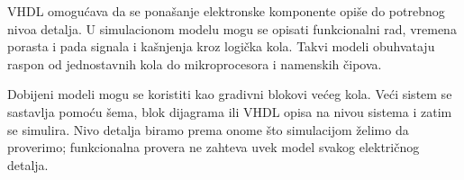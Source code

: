 VHDL omogućava da se ponašanje elektronske komponente opiše do potrebnog nivoa detalja. U simulacionom modelu mogu se opisati funkcionalni rad, vremena porasta i pada signala i kašnjenja kroz logička kola. Takvi modeli obuhvataju raspon od jednostavnih kola do mikroprocesora i namenskih čipova.

Dobijeni modeli mogu se koristiti kao gradivni blokovi većeg kola. Veći sistem se sastavlja pomoću šema, blok dijagrama ili VHDL opisa na nivou sistema i zatim se simulira. Nivo detalja biramo prema onome što simulacijom želimo da proverimo; funkcionalna provera ne zahteva uvek model svakog električnog detalja.
